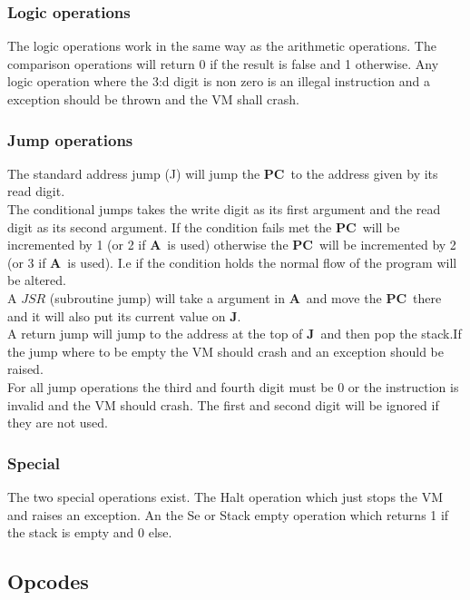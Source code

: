 \documentclass{article}
\newcommand{\A}{$\textbf{A}$}
\newcommand{\pc}{$\textbf{PC}$}
\newcommand{\J}{$\textbf{J}$}
\begin{document}
\subsubsection{Logic operations}
The logic operations work in the same way as the arithmetic operations. The
comparison operations will return 0 if the result is false and 1 otherwise.
Any logic operation where the 3:d digit is non zero is an illegal instruction
and a exception should be thrown and the VM shall crash.

\subsubsection{Jump operations}
The standard address jump (J) will jump the \pc \ to the address given by its
read digit.\\
The conditional jumps takes the write digit as its first argument and the read
digit as its second argument. If the condition fails met the \pc \ will be
incremented by 1 (or 2 if \A \ is used) otherwise the \pc \ will be incremented
by 2 (or 3 if \A \ is used). I.e if the condition holds the normal flow of the
program will be altered.\\
A $JSR$ (subroutine jump) will take a argument in \A \ and move the \pc \
there and it will also put its current value on \J.\\
A return jump will jump to the address at the top of \J \ and then pop the
stack.If the jump where to be empty the VM should crash and an exception
should be raised.\\
For all jump operations the third and fourth digit must be 0 or the instruction
is invalid and the VM should crash. The first and second digit will be ignored
if they are not used.

\subsubsection{Special}
The two special operations exist. The Halt operation which just stops the VM and
raises an exception.
An the Se or Stack empty operation which returns 1 if the stack is empty and 0
else.

\subsection{Opcodes}
\end{document}
